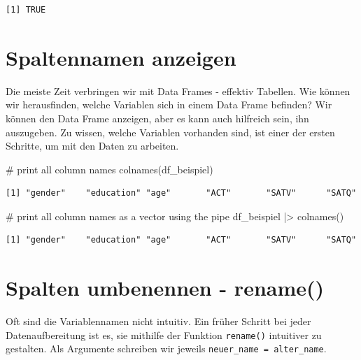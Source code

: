 \documentclass[
  letterpaper,
  DIV=11,
  numbers=noendperiod]{scrreprt}
\newenvironment{Shaded}{\begin{snugshade}}{\end{snugshade}}
\newcommand{\CommentTok}[1]{\textcolor[rgb]{0.37,0.37,0.37}{#1}}
\newcommand{\FunctionTok}[1]{\textcolor[rgb]{0.28,0.35,0.67}{#1}}
\newcommand{\NormalTok}[1]{\textcolor[rgb]{0.00,0.23,0.31}{#1}}
\newcommand{\SpecialCharTok}[1]{\textcolor[rgb]{0.37,0.37,0.37}{#1}}
\begin{document}
\begin{verbatim}
[1] TRUE
\end{verbatim}


\chapter{Spaltennamen anzeigen}\label{spaltennamen-anzeigen}

Die meiste Zeit verbringen wir mit Data Frames - effektiv Tabellen. Wie
können wir herausfinden, welche Variablen sich in einem Data Frame
befinden? Wir können den Data Frame anzeigen, aber es kann auch
hilfreich sein, ihn auszugeben. Zu wissen, welche Variablen vorhanden
sind, ist einer der ersten Schritte, um mit den Daten zu arbeiten.

\begin{Shaded}
\begin{Highlighting}[]
\CommentTok{\# print all column names}
\FunctionTok{colnames}\NormalTok{(df\_beispiel)}
\end{Highlighting}
\end{Shaded}

\begin{verbatim}
[1] "gender"    "education" "age"       "ACT"       "SATV"      "SATQ"     
\end{verbatim}

\begin{Shaded}
\begin{Highlighting}[]
\CommentTok{\# print all column names as a vector using the pipe}
\NormalTok{df\_beispiel }\SpecialCharTok{|\textgreater{}} 
  \FunctionTok{colnames}\NormalTok{()}
\end{Highlighting}
\end{Shaded}

\begin{verbatim}
[1] "gender"    "education" "age"       "ACT"       "SATV"      "SATQ"     
\end{verbatim}


\chapter{Spalten umbenennen -
rename()}\label{spalten-umbenennen---rename}

Oft sind die Variablennamen nicht intuitiv. Ein früher Schritt bei jeder
Datenaufbereitung ist es, sie mithilfe der Funktion \texttt{rename()}
intuitiver zu gestalten. Als Argumente schreiben wir jeweils
\texttt{neuer\_name\ =\ alter\_name}.
\end{document}

